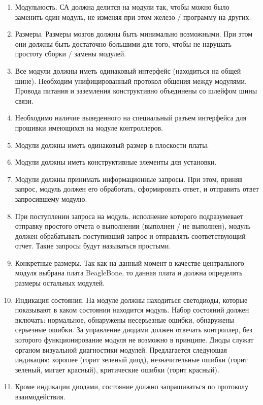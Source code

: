 \documentclass[utf8]{report}
\begin{document}
\begin{enumerate}
  \item Модульность. СА должна делится на модули так, чтобы можно было заменить один модуль, не изменяя при этом железо / программу на других.
  \item Размеры. Размеры мозгов должны быть минимально возможными. При этом они должны быть достаточно большими для того, чтобы не нарушать простоту сборки / замены модулей.
  \item Все модули должны иметь одинаковый интерфейс (находиться на общей шине). Необходим унифицированный протокол общения между модулями. Провода питания и заземления конструктивно объединены со шлейфом шины связи.
  \item Необходимо наличие выведенного на специальный разъем интерфейса для прошивки имеющихся на модуле контроллеров.
  \item Модули должны иметь одинаковый размер в плоскости платы.
  \item Модули должны иметь конструктивные элементы для установки.
  \item Модули должны принимать информационные запросы. При этом, приняв запрос, модуль должен его обработать, сформировать ответ, и отправить ответ запросившему модулю.
  \item При поступлении запроса на модуль, исполнение которого подразумевает отправку простого отчета о выполнении (выполнен / не выполнен), модуль должен обрабатывать поступивший запрос и отправлять соответствующий отчет. Такие запросы будут называться простыми.
  \item Конкретные размеры. Так как на данный момент в качестве центрального модуля выбрана плата BeagleBone, то данная плата и должна определять размеры остальных модулей.
  \item Индикация состояния. На модуле должны находиться светодиоды, которые показывают в каком состоянии находится модуль. Набор состояний должен включать: нормальное, обнаружены несерьезные ошибки, обнаружены серьезные ошибки. За управление диодами должен отвечать контроллер, без которого функционирование модуля не возможно в принципе. Диоды служат органом визуальной диагностики модулей. Предлагается следующая индикация: хорошее (горит зеленый диод), незначительные ошибки (горит зеленый, мигает красный), критические ошибки (горит красный).
  \item Кроме индикации диодами, состояние должно запрашиваться по протоколу взаимодействия.
\end{enumerate}
\end{document}
